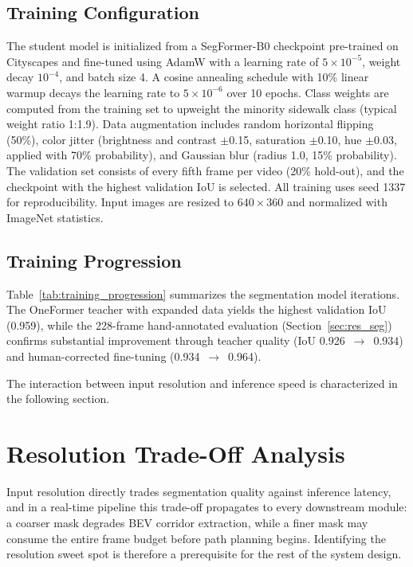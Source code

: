 \documentclass[12pt,letterpaper,oneside]{report}
\begin{document}
\subsection{Training Configuration}

The student model is initialized from a SegFormer-B0 checkpoint pre-trained on Cityscapes and fine-tuned using AdamW with a learning rate of $5 \times 10^{-5}$, weight decay $10^{-4}$, and batch size 4.  A cosine annealing schedule with 10\% linear warmup decays the learning rate to $5 \times 10^{-6}$ over 10 epochs.  Class weights are computed from the training set to upweight the minority sidewalk class (typical weight ratio 1:1.9).  Data augmentation includes random horizontal flipping (50\%), color jitter (brightness and contrast $\pm$0.15, saturation $\pm$0.10, hue $\pm$0.03, applied with 70\% probability), and Gaussian blur (radius 1.0, 15\% probability).  The validation set consists of every fifth frame per video (20\% hold-out), and the checkpoint with the highest validation IoU is selected.  All training uses seed 1337 for reproducibility.  Input images are resized to $640 \times 360$ and normalized with ImageNet statistics.


\subsection{Training Progression}

Table~\ref{tab:training_progression} summarizes the segmentation model iterations. The OneFormer teacher with expanded data yields the highest validation IoU (0.959), while the 228-frame hand-annotated evaluation (Section~\ref{sec:res_seg}) confirms substantial improvement through teacher quality (IoU 0.926~$\to$~0.934) and human-corrected fine-tuning (0.934~$\to$~0.964).



The interaction between input resolution and inference speed is characterized in the following section.


\section{Resolution Trade-Off Analysis}
\label{sec:resolution}

Input resolution directly trades segmentation quality against inference latency, and in a real-time pipeline this trade-off propagates to every downstream module: a coarser mask degrades BEV corridor extraction, while a finer mask may consume the entire frame budget before path planning begins. Identifying the resolution sweet spot is therefore a prerequisite for the rest of the system design.
\end{document}
